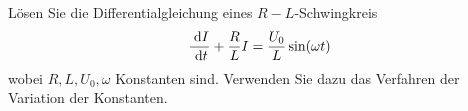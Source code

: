 \begin{atiTask}[
  title = Variation der Konstanten
]
Lösen Sie die Differentialgleichung eines $R-L$-Schwingkreis
\begin{equation*}
\frac{\;\mathrm{d} I}{\;\mathrm{d} t}+\frac{R}{L}I=\frac{U_0}{L}\sin (\omega t)
\end{equation*}
wobei $R, L, U_0, \omega$ Konstanten sind. Verwenden Sie dazu das Verfahren der Variation der Konstanten.  \end{atiTask}
